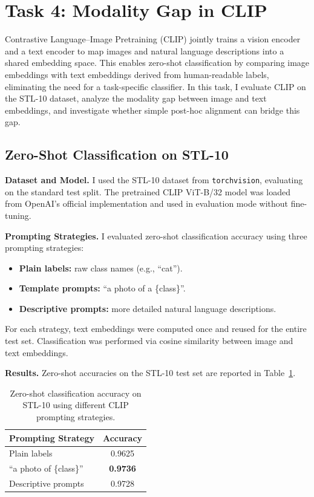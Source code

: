 \documentclass{article}
\begin{document}
\newpage
\section{Task 4: Modality Gap in CLIP}

Contrastive Language--Image Pretraining (CLIP) jointly trains a vision encoder and a text encoder to map images and natural language descriptions into a shared embedding space. This enables zero-shot classification by comparing image embeddings with text embeddings derived from human-readable labels, eliminating the need for a task-specific classifier. In this task, I evaluate CLIP on the STL-10 dataset, analyze the modality gap between image and text embeddings, and investigate whether simple post-hoc alignment can bridge this gap.

\subsection{Zero-Shot Classification on STL-10}

\textbf{Dataset and Model.}  
I used the STL-10 dataset from \texttt{torchvision}, evaluating on the standard test split. The pretrained CLIP ViT-B/32 model was loaded from OpenAI’s official implementation and used in evaluation mode without fine-tuning.

\textbf{Prompting Strategies.}  
I evaluated zero-shot classification accuracy using three prompting strategies:
\begin{itemize}
    \item \textbf{Plain labels:} raw class names (e.g., ``cat'').
    \item \textbf{Template prompts:} ``a photo of a \{class\}''.
    \item \textbf{Descriptive prompts:} more detailed natural language descriptions.
\end{itemize}

For each strategy, text embeddings were computed once and reused for the entire test set. Classification was performed via cosine similarity between image and text embeddings.

\textbf{Results.}  
Zero-shot accuracies on the STL-10 test set are reported in Table~\ref{tab:clip-zeroshot}.

\begin{table}[t]
\caption{Zero-shot classification accuracy on STL-10 using different CLIP prompting strategies.}
\label{tab:clip-zeroshot}
\vskip 0.15in
\centering
\begin{small}
\begin{tabular}{l c}
\toprule
Prompting Strategy & Accuracy \\
\midrule
Plain labels & 0.9625 \\
``a photo of \{class\}'' & \textbf{0.9736} \\
Descriptive prompts & 0.9728 \\
\bottomrule
\end{tabular}
\end{small}
\vskip -0.1in
\end{table}
\end{document}
